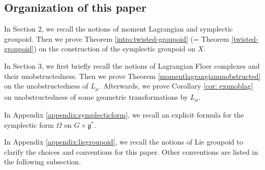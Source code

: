 \documentclass{amsart}
\numberwithin{equation}{section}
\begin{document}
\subsection*{Organization of this paper} In Section 2, we recall the notions of moment Lagrangian and symplectic groupoid. Then we prove Theorem \ref{intro:twisted-groupoid} (= Theorem \ref{twisted-groupoid}) on the construction of the symplectic groupoid on $X$.

In Section 3, we first briefly recall the notions of Lagrangian Floer complexes and their unobstructedness. Then we prove Theorem \ref{momentlagrangianunobstructed} on the unobstructedness of $L_\mu$. 
Afterwards, we prove Corollary \ref{cor: exunoblag} on unobstructedness of some geometric transformations by $L_\mu$.

In Appendix \ref{appendix:symplecticform}, we recall an explicit formula for the symplectic form $\Omega$ on $G \times \mathfrak{g}^*$.

In Appendix \ref{appendix:liegroupoid}, we recall the notions of Lie groupoid to clarify the choices and conventions for this paper. Other conventions are listed in the following subsection.
\end{document}
